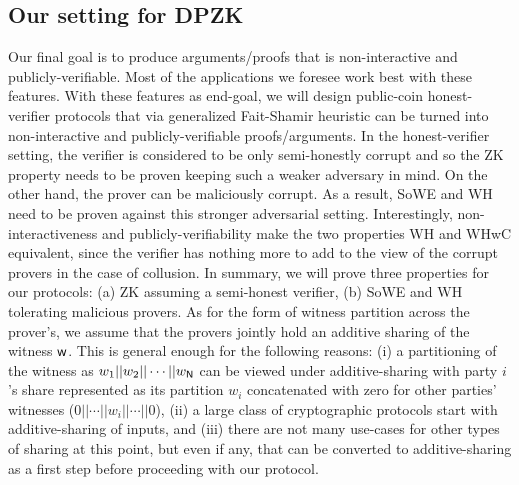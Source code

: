 \subsection{Our setting for DPZK}
Our final goal is to produce arguments/proofs that is non-interactive and publicly-verifiable. Most of the applications we foresee work best  with these features. With these features as end-goal, we  will design public-coin honest-verifier  protocols that via generalized Fait-Shamir heuristic \cite{FS86, BCS16} can be turned into non-interactive and publicly-verifiable proofs/arguments.  In the honest-verifier setting, the verifier is considered to be only semi-honestly corrupt and so the ZK property needs to be proven keeping such a weaker adversary in mind. On the other hand,   the prover can be maliciously corrupt.  As a result,  SoWE and  WH  need to be proven against this stronger adversarial setting. Interestingly,  non-interactiveness and publicly-verifiability make the two properties WH and WHwC equivalent, since the verifier has nothing more to add to the view of the corrupt provers in the case of collusion. In summary,  we will prove three properties for our protocols: (a) ZK assuming a semi-honest verifier, (b)  SoWE and WH tolerating malicious  provers. As for the form of witness partition across the prover's, we assume that the provers jointly hold an additive sharing of the witness $\mathsf{w}$. This is general enough for the following reasons: (i) a partitioning of the witness as $w_1 || w_2 || \cdots || w_{\mathsf{N}}$ can be viewed under additive-sharing with party $i$'s share represented as its partition $w_i$ concatenated with zero for other parties' witnesses ($0 || \cdots || w_i || \cdots || 0$), (ii) a large class of cryptographic protocols start with additive-sharing of inputs, and (iii) there are not many use-cases for other types of sharing at this point, but even if any, that can be converted to additive-sharing as a first step before proceeding with our protocol.
 


